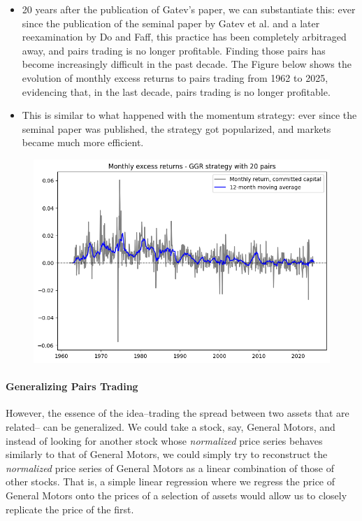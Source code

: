 \begin{itemize}
\begin{itemize}
\item 20 years after the publication of Gatev's paper, we can substantiate this: ever since the publication of the seminal paper by Gatev et al. and a later reexamination by Do and Faff, this practice has been completely arbitraged away, and pairs trading is no longer profitable. Finding those pairs has become increasingly difficult in the past decade. The Figure below shows the evolution of monthly excess returns to pairs trading from 1962 to 2025, evidencing that, in the last decade, pairs trading is no longer profitable.
\item This is similar to what happened with the momentum strategy: ever since the seminal paper was published, the strategy got popularized, and markets became much more efficient.
\end{itemize}

\end{itemize}

\begin{figure}[H]
\centering
\includegraphics[scale=0.8]{fig_pairs_trading_evolution.png}
\end{figure}



\paragraph{Generalizing Pairs Trading}
However, the essence of the idea--trading the spread between two assets that are related-- can be generalized. We could take a stock, say, General Motors, and instead of looking for another stock whose \textit{normalized} price series behaves similarly to that of General Motors, we could simply try to reconstruct the \textit{normalized} price series of General Motors as a linear combination of those of other stocks. That is, a simple linear regression where we regress the price of General Motors onto the prices of a selection of assets would allow us to closely replicate the price of the first. 


